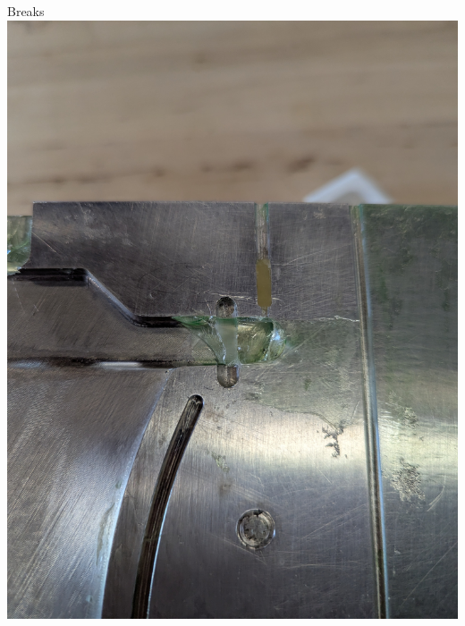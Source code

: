 \begin{frame}{Breaks}
    \centering
    \includegraphics[height=0.5\textheight,keepaspectratio]{images/sf_mold_tail_broken.jpg}

\end{frame}

